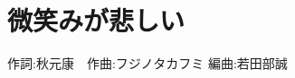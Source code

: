 \section{微笑みが悲しい}

\begin{center}
    \scriptsize{
        作詞:秋元康　作曲:フジノタカフミ	編曲:若田部誠
    }
\end{center}

\vspace{0.7em}

\begin{Parallel}[c]{0.47\textwidth}{0.47\textwidth}

\ParallelLText{
    \footnotesize{
        
    }
}

\ParallelRText{
    \footnotesize{
        
    }
}

\end{Parallel}
